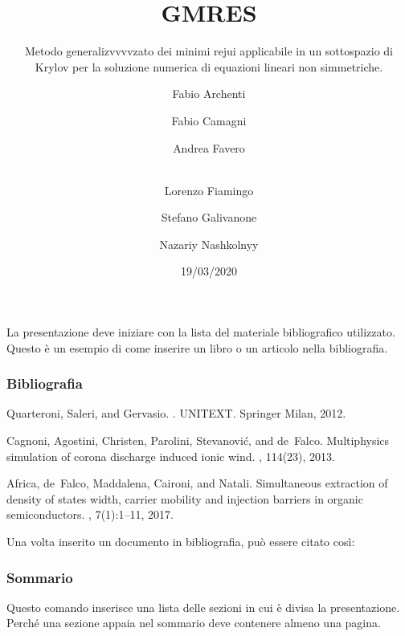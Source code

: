 \documentclass[10pt]{beamer}
\begin{document}
\begin{frame}
  \title{GMRES}
  \subtitle{Metodo generalizvvvvzato dei minimi rejui applicabile in un sottospazio di Krylov per la soluzione numerica di equazioni lineari non simmetriche.}
  \date{19/03/2020}
  \author[Principal]{Fabio Archenti \and Fabio Camagni \and Andrea Favero \and  \\Lorenzo Fiamingo \and Stefano Galivanone \and Nazariy Nashkolnyy}
  \maketitle
\end{frame}


\begin{frame}

La presentazione deve iniziare con la lista del materiale
bibliografico utilizzato. Questo è un esempio di come inserire 
un libro o un articolo nella bibliografia.
  \frametitle{Bibliografia}
  \begin{thebibliography}{99}\small
    
    Quarteroni, Saleri, and Gervasio.
    .
    \newblock UNITEXT. Springer Milan, 2012.

    Cagnoni, Agostini, Christen, Parolini, Stevanovi{\'c}, and de~Falco.
    \newblock Multiphysics simulation of corona discharge induced ionic wind.
    , 114(23), 2013.

   Africa, de~Falco, Maddalena, Caironi, and Natali.
   \newblock Simultaneous extraction of density of states width, carrier mobility
   and injection barriers in organic semiconductors.
   , 7(1):1--11, 2017.

   \end{thebibliography}

Una volta inserito un documento in bibliografia, 
può essere citato così:~\cite{quarteroni2012calcolo}
  
\end{frame}  

\begin{frame}
  \frametitle{Sommario}
  Questo comando inserisce una lista delle sezioni in
  cui è divisa la presentazione. Perché una sezione appaia 
  nel sommario deve contenere almeno una pagina.
  \tableofcontents
\end{frame}
\end{document}
